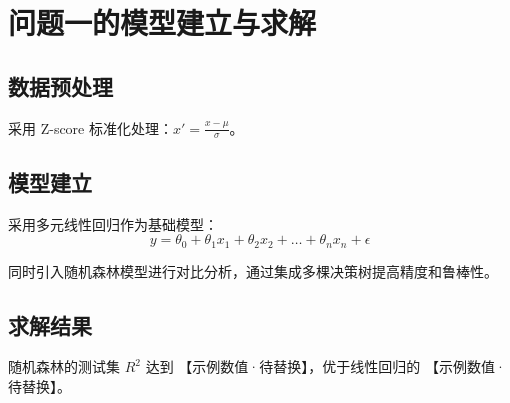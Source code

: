 \section{问题一的模型建立与求解}

\subsection{数据预处理}

采用 Z-score 标准化处理：$x' = \frac{x - \mu}{\sigma}$。

\subsection{模型建立}

采用多元线性回归作为基础模型：
\[
  y = \theta_0 + \theta_1 x_1 + \theta_2 x_2 + \dots + \theta_n x_n + \epsilon
\]

同时引入随机森林模型进行对比分析，通过集成多棵决策树提高精度和鲁棒性。

\subsection{求解结果}

随机森林的测试集 $R^2$ 达到 【示例数值·待替换】，优于线性回归的 【示例数值·待替换】。

